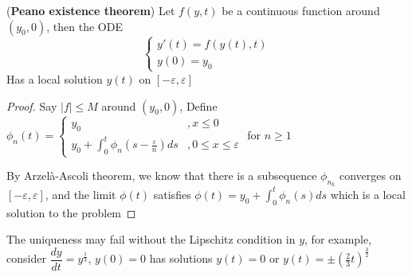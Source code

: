 \documentclass[main]{subfiles}
\begin{document}
\begin{theorem}(\textbf{Peano existence theorem})\label{Peano existence theorem}
Let $f(y,t)$ be a continuous function around $(y_0,0)$, then the ODE $$\begin{cases}
y'(t)=f(y(t),t) \\
y(0)=y_0
\end{cases}$$Has a local solution $y(t)$ on $[-\varepsilon,\varepsilon]$
\end{theorem}

\begin{proof}
Say $|f|\leq M$ around $(y_0,0)$, 
Define $\phi_n(t)=\begin{cases}
y_0&, x\leq0 \\
y_0+\displaystyle\int_0^t\phi_n\left(s-\frac{\varepsilon}{n}\right)ds&, 0\leq x\leq\varepsilon
\end{cases}$ for $n\geq1$ \par
By Arzel\`a-Ascoli theorem, we know that there is a subsequence $\phi_{n_k}$ converges on $[-\varepsilon,\varepsilon]$, and the limit $\phi(t)$ satisfies $\phi(t)=y_0+\displaystyle\int_0^t\phi_n\left(s\right)ds$ which is a local solution to the problem
\end{proof}

\begin{remark}
The uniqueness may fail without the Lipschitz condition in $y$, for example, consider $\dfrac{dy}{dt}=y^{\frac{1}{3}}$, $y(0)=0$ has solutions $y(t)=0$ or $y(t)=\pm\left(\frac{2}{3}t\right)^{\frac{3}{2}}$
\end{remark}
\end{document}
